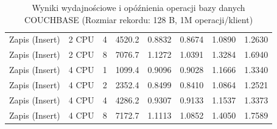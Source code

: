 \begin{table}[ht]
{\begin{tabular}{llcrrrrr}
Zapis (Insert) & 2 CPU & 4 & 4520.2 & 0.8832 & 0.8674 & 1.0890 & 1.2630 \\
Zapis (Insert) & 2 CPU & 8 & 7076.7 & 1.1272 & 1.0391 & 1.3284 & 1.6940 \\
Zapis (Insert) & 4 CPU & 1 & 1099.4 & 0.9096 & 0.9028 & 1.1666 & 1.3340 \\
Zapis (Insert) & 4 CPU & 2 & 2352.4 & 0.8499 & 0.8410 & 1.0864 & 1.2521 \\
Zapis (Insert) & 4 CPU & 4 & 4286.2 & 0.9307 & 0.9133 & 1.1537 & 1.3373 \\
Zapis (Insert) & 4 CPU & 8 & 7172.7 & 1.1113 & 1.0852 & 1.4050 & 1.7589 \\
\bottomrule
\end{tabular}%
}
\caption{Wyniki wydajnościowe i opóźnienia operacji bazy danych COUCHBASE (Rozmiar rekordu: 128 B, 1M operacji/klient)}
\label{tab:latency_couchbase_small_1000000}
\end{table}
